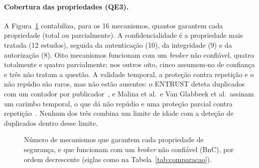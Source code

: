 \paragraph{Cobertura das propriedades (QE3).} A Figura~\ref{fig:propriedades}
contabiliza, para os 16 mecanismos, quantos garantem cada propriedade (total ou
parcialmente). A confidencialidade é a propriedade mais tratada (12 estudos),
seguida da autenticação (10), da integridade (9) e da autorização (8). Oito
mecanismos funcionam com um \emph{broker} não confiável, quatro totalmente e quatro
parcialmente; nos outros oito, cinco assumem-no de confiança e três não tratam a
questão. A
validade temporal, a proteção contra repetição e o não repúdio são raros, mas não
estão ausentes: o ENTRUST deteta duplicados com um contador por
publicador~\cite{dahlmanns2021entrust}, e Malina et al.\ e Van Glabbeek et al.\
assinam um carimbo temporal, o que dá não repúdio e uma proteção parcial contra
repetição~\cite{malina2019secure, vanglabbeek2022flexible}. Nenhum dos três combina
um limite de idade com a deteção de duplicados dentro desse limite.

\begin{figure}[ht]
  \centering
  \caption{Número de mecanismos que garantem cada propriedade de segurança, e que
    funcionam com um \emph{broker} não confiável (BnC), por ordem decrescente
    (siglas como na Tabela~\ref{tab:comparacao}).}
  \label{fig:propriedades}
\end{figure}

